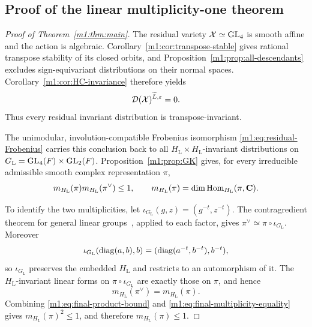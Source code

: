 \subsection{Proof of the linear multiplicity-one theorem}\label{m1:sec:completion}
\begin{proof}[Proof of Theorem~\ref{m1:thm:main}]
The residual variety $\mathcal X\simeq\operatorname{GL}_4$ is smooth affine and the action
is algebraic. Corollary~\ref{m1:cor:transpose-stable} gives rational
transpose stability of its closed orbits, and
Proposition~\ref{m1:prop:all-descendants} excludes sign-equivariant
distributions on their normal spaces. Corollary~\ref{m1:cor:HC-invariance} therefore yields
\[
 \mathcal D(\mathcal X)^{\widetilde L,\varepsilon}=0.
\]
Thus every residual invariant distribution is transpose-invariant.

The unimodular, involution-compatible Frobenius isomorphism
\eqref{m1:eq:residual-Frobenius} carries this conclusion back to all
$H_{\mathrm L}\times H_{\mathrm L}$-invariant distributions on
$G_{\mathrm L}=\operatorname{GL}_4(F)\times\operatorname{GL}_2(F)$. Proposition~\ref{m1:prop:GK} gives, for every
irreducible admissible smooth complex representation $\pi$,
\begin{equation}\label{m1:eq:final-product-bound}
 m_{H_{\mathrm L}}(\pi)m_{H_{\mathrm L}}(\pi^\vee)\leq1,
 \qquad m_{H_{\mathrm L}}(\pi)=\dim\operatorname{Hom}_{H_{\mathrm L}}(\pi,\mathbf C).
\end{equation}

To identify the two multiplicities, let
$\iota_{G_{\mathrm L}}(g,z)=(g^{-t},z^{-t})$. The contragredient theorem for general
linear groups~\cite[Theorem~7.3]{BZ76}, applied to each factor, gives
$\pi^\vee\simeq\pi\circ\iota_{G_{\mathrm L}}$. Moreover
\[
 \iota_{G_{\mathrm L}}(\operatorname{diag}(a,b),b)=(\operatorname{diag}(a^{-t},b^{-t}),b^{-t}),
\]
so $\iota_{G_{\mathrm L}}$ preserves the embedded $H_{\mathrm L}$ and restricts to an automorphism
of it. The $H_{\mathrm L}$-invariant linear forms on $\pi\circ\iota_{G_{\mathrm L}}$ are exactly
those on $\pi$, and hence
\begin{equation}\label{m1:eq:final-multiplicity-equality}
 m_{H_{\mathrm L}}(\pi^\vee)=m_{H_{\mathrm L}}(\pi).
\end{equation}
Combining \eqref{m1:eq:final-product-bound} and
\eqref{m1:eq:final-multiplicity-equality} gives $m_{H_{\mathrm L}}(\pi)^2\leq1$, and
therefore $m_{H_{\mathrm L}}(\pi)\leq1$.
\end{proof}
